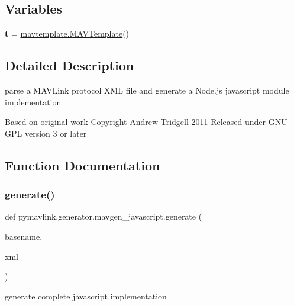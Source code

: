 \subsection*{Variables}
\begin{DoxyCompactItemize}
\item 
\mbox{\label{namespacepymavlink_1_1generator_1_1mavgen__javascript_ad711c52bdae50feb5c8562d1dd3d8ba7}} 
{\bfseries t} = \hyperlink{classpymavlink_1_1generator_1_1mavtemplate_1_1MAVTemplate}{mavtemplate.\+M\+A\+V\+Template}()
\end{DoxyCompactItemize}


\subsection{Detailed Description}
\begin{DoxyVerb}parse a MAVLink protocol XML file and generate a Node.js javascript module implementation

Based on original work Copyright Andrew Tridgell 2011
Released under GNU GPL version 3 or later
\end{DoxyVerb}
 

\subsection{Function Documentation}
\mbox{\label{namespacepymavlink_1_1generator_1_1mavgen__javascript_a91d9cd83428167ae922bb2bf9c97f811}} 
\subsubsection{\texorpdfstring{generate()}{generate()}}
{\footnotesize\ttfamily def pymavlink.\+generator.\+mavgen\+\_\+javascript.\+generate (\begin{DoxyParamCaption}\item[{}]{basename,  }\item[{}]{xml }\end{DoxyParamCaption})}

\begin{DoxyVerb}generate complete javascript implementation\end{DoxyVerb}
 \mbox{\label{namespacepymavlink_1_1generator_1_1mavgen__javascript_aa0aa15fc819656c01cf8decc8f7ace6a}} 
